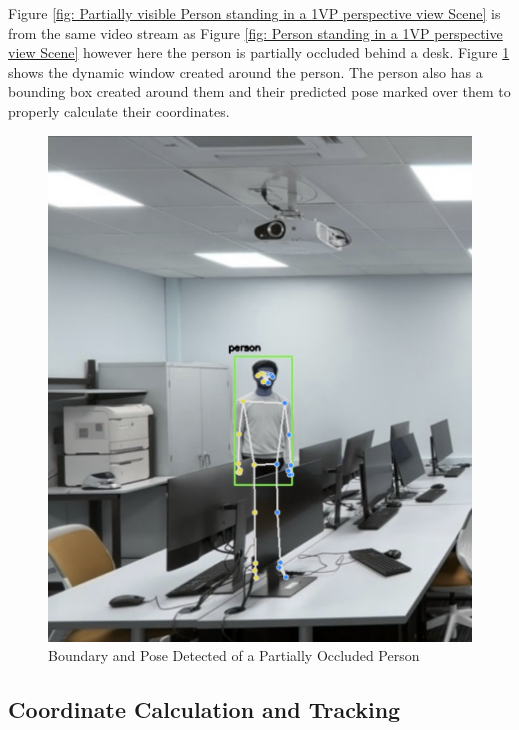 \documentclass[12pt]{report}
\begin{document}
Figure \ref{fig: Partially visible Person standing in a 1VP perspective view Scene} is from the same video stream as Figure \ref{fig: Person standing in a 1VP perspective view Scene} however here the person is partially occluded behind a desk. Figure \ref{fig: Boundary and pose detected of a partially occluded person} shows the dynamic window created around the person. The person also has a bounding box created around them and their predicted pose marked over them to properly calculate their coordinates.\newline

\begin{figure}[H]
    \centering
    \includegraphics[width=1.0\textwidth]{1vp partial person pose.png}
    \caption{Boundary and Pose Detected of a Partially Occluded Person}
    \label{fig: Boundary and pose detected of a partially occluded person}
\end{figure}

\subsection{Coordinate Calculation and Tracking}
\end{document}
